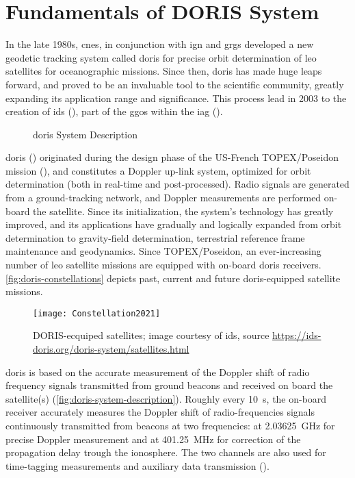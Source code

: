 \section{Fundamentals of DORIS System}\label{sec:doris-system-fundamentals}
In the late 1980s, \gls{cnes}, in conjunction with \gls{ign} and \gls{grgs} developed 
a new geodetic tracking system called \gls{doris} for precise orbit determination 
of \gls{leo} satellites for oceanographic missions. Since then, \gls{doris} has 
made huge leaps forward, and proved to be an invaluable tool to the scientific community, 
greatly expanding its application range and significance. This process lead in 
2003 to the creation of \gls{ids} (\cite{Willis2016a}), part of the \gls{ggos} 
within the \gls{iag} (\cite{Willis2006}). 

\begin{figure}
  \centering
  
  \caption{\gls{doris} System Description}
  \label{fig:doris-system-description}
\end{figure}

\gls{doris} (\cite{Barlier2005}) originated during the design phase of the US-French 
TOPEX/Poseidon mission (\cite{Fu1994}), 
and constitutes a Doppler up-link system, optimized for orbit determination (both 
in real-time and post-processed). Radio signals are generated from a ground-tracking 
network, and Doppler measurements are performed on-board the satellite. Since its 
initialization, the system's technology has greatly improved, and its applications 
have gradually and logically expanded from orbit determination to gravity-field 
determination, terrestrial reference frame maintenance and geodynamics. Since TOPEX/Poseidon, an 
ever-increasing number of \gls{leo} satellite missions are equipped with on-board 
\gls{doris} receivers. \autoref{fig:doris-constellations} depicts past, current and 
future \gls{doris}-equipped satellite missions.

\begin{figure}[h!]
  \centering
  \texttt{[image: Constellation2021]}
  \caption{DORIS-ecquiped satellites; image courtesy of \gls{ids}, source \url{https://ids-doris.org/doris-system/satellites.html}}
  \label{fig:doris-constellations}
\end{figure}

\gls{doris} is based on the accurate measurement of the Doppler shift of radio 
frequency signals transmitted from ground beacons and received on board the 
satellite(s) (\autoref{fig:doris-system-description}). Roughly every \SI{10}{\second}, 
the on-board receiver accurately measures 
the Doppler shift of radio-frequencies signals continuously transmitted from 
beacons at two frequencies: at \SI{2.03625}{\GHz} for precise Doppler measurement 
and at \SI{401.25}{\MHz} for correction of the propagation delay trough the 
ionosphere. The two channels are also used for time-tagging measurements and 
auxiliary data transmission (\cite{Auriol2010}).

